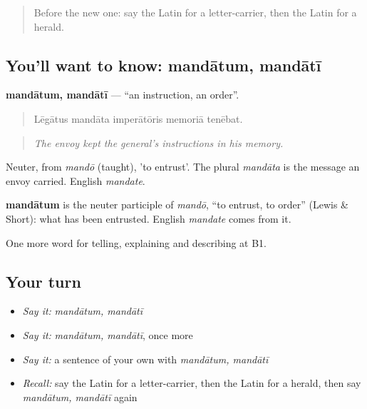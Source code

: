 \label{lesson:LA-C300-mandatum}



\begin{quote}
Before the new one: say the Latin for a letter-carrier, then the Latin for a herald.
\end{quote}

\subsection*{You'll want to know: mandātum, mandātī}
\textbf{mandātum, mandātī} — \textquotedblleft{}an instruction, an order\textquotedblright{}.

\begin{quote}
Lēgātus mandāta imperātōris memoriā tenēbat.
\end{quote}

\begin{quote}
\emph{The envoy kept the general's instructions in his memory.}
\end{quote}

Neuter, from \emph{mandō} (taught), 'to entrust'. The plural \emph{mandāta} is the message an envoy carried. English \emph{mandate}.

\begin{cousinweb}
\textbf{mandātum} is the neuter participle of \emph{mandō}, \textquotedblleft{}to entrust, to order\textquotedblright{} (Lewis \& Short): what has been entrusted. English \emph{mandate} comes from it.
\end{cousinweb}

\begin{grammarlens}[title={What you've built}]
One more word for telling, explaining and describing at B1.
\end{grammarlens}

\subsection*{Your turn}
\begin{itemize}
\raggedright
  \item \emph{Say it:} \emph{mandātum, mandātī}
  \item \emph{Say it:} \emph{mandātum, mandātī}, once more
  \item \emph{Say it:} a sentence of your own with \emph{mandātum, mandātī}
  \item \emph{Recall:} say the Latin for a letter-carrier, then the Latin for a herald, then say \emph{mandātum, mandātī} again
\end{itemize}

